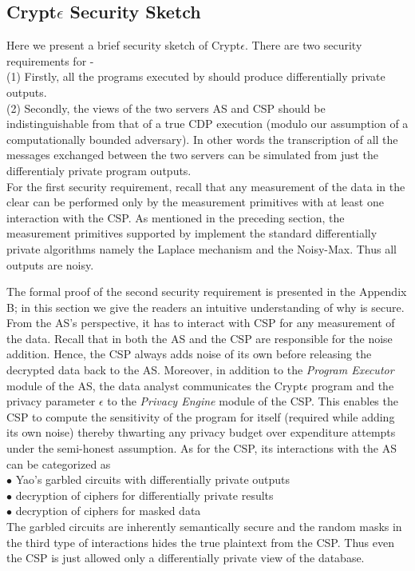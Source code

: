 \subsection{Crypt$\epsilon$ Security Sketch}
Here we present a brief security sketch of  Crypt$\epsilon$.  There are two security requirements for \system - \\
(1) Firstly, all the programs executed by \system  should produce differentially private outputs. \\
(2) Secondly, the views of the two servers \textsf{AS} and {CSP} should be indistinguishable from that of a true \textsf{CDP} execution (modulo our assumption of a computationally bounded adversary). In other words the transcription of all the messages exchanged between the two servers can be simulated from just the differentialy private program outputs. 
\\  For the first security requirement, recall that any measurement of the data in the clear can be performed only by the measurement primitives with at least one interaction with the \textsf{CSP}. As mentioned in the preceding section, the measurement primitives supported by \system implement the standard differentially private algorithms namely the Laplace mechanism and the Noisy-Max. Thus all \system outputs are noisy.

The formal proof of the second security requirement is presented in the  Appendix B; in this section we give the readers an intuitive understanding of why \system is secure.  From the \textsf{AS}'s perspective, it has to interact with \textsf{CSP} for any measurement of the data. Recall that in \system  both the \textsf{AS} and the \textsf{CSP} are
responsible for the noise addition. Hence, the \textsf{CSP} always adds
noise of its own before releasing the decrypted data back to the
\textsf{AS}.  Moreover, in addition to the \textit{Program Executor} module of the \textsf{AS}, the data analyst communicates the Crypt$\epsilon$ program and the privacy parameter $\epsilon$ to the \textit{Privacy Engine} module of the \textsf{CSP}. This enables the \textsf{CSP} to compute the sensitivity  of the program for itself (required while adding its own noise) thereby thwarting any privacy budget over expenditure attempts under the semi-honest assumption. As for the \textsf{CSP}, its interactions with the \textsf{AS} can be categorized as   \\$\bullet$ Yao's garbled circuits with differentially private outputs \\$\bullet $ decryption of ciphers for differentially private results \\$\bullet$ decryption of ciphers for masked data  \\ The garbled circuits are inherently semantically secure and the random masks in the third type of interactions hides the true plaintext  from the \textsf{CSP}. Thus even the \textsf{CSP} is just allowed only a differentially private view of the database.





